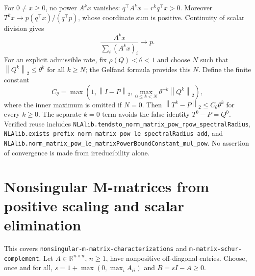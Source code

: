 \documentclass[11pt,a4paper]{article}
\newcommand{\R}{\mathbb R}
\newcommand{\norm}[1]{\left\lVert#1\right\rVert}
\DeclareRobustCommand{\code}[1]{{\footnotesize\urlstyle{tt}\nolinkurl{#1}}}
\begin{document}
For $0\ne x\ge0$, no power $A^kx$ vanishes: $q^\top A^kx=r^kq^\top x>0$.
Moreover
$T^kx\to p(q^\top x)/(q^\top p)$, whose coordinate sum is positive.
Continuity of scalar division gives
\[
 \frac{A^kx}{\sum_i(A^kx)_i}\longrightarrow p.
\]
For an explicit admissible rate, fix $\rho(Q)<\theta<1$ and choose $N$
such that $\norm{Q^k}_2\le\theta^k$ for all $k\ge N$; the Gelfand
formula provides this $N$. Define the finite constant
\[
 C_\theta=\max\left(1,\norm{I-P}_2,
             \max_{0\le k<N}\theta^{-k}\norm{Q^k}_2\right),
\]
where the inner maximum is omitted if $N=0$. Then
$\norm{T^k-P}_2\le C_\theta\theta^k$ for every $k\ge0$.
The separate $k=0$ term avoids the false identity $T^0-P=Q^0$.
Verified reuse includes
\code{NLAlib.tendsto_norm_matrix_pow_rpow_spectralRadius},
\code{NLAlib.exists_prefix_norm_matrix_pow_le_spectralRadius_add}, and
\code{NLAlib.norm_matrix_pow_le_matrixPowerBoundConstant_mul_pow}.
No assertion of convergence is made from irreducibility alone.

\section{Nonsingular M-matrices from positive scaling and scalar elimination}
\label{sec:ns-mmatrix}

This covers \code{nonsingular-m-matrix-characterizations} and
\code{m-matrix-schur-complement}. Let $A\in\R^{n\times n}$, $n\ge1$,
have nonpositive off-diagonal entries. Choose, once and for all,
$s=1+\max(0,\max_i A_{ii})$ and $B=sI-A\ge0$.
\end{document}
